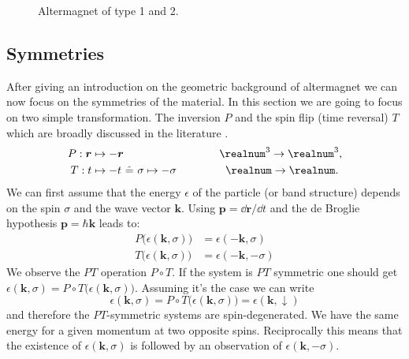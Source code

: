 \documentclass[../main.tex]{main.tex}
\begin{document}
\begin{figure}[H]

    \caption{Altermagnet of type 1 and 2.}
    \label{fig:altermagnet_lattice}
\end{figure}    

\subsection{Symmetries}
After giving an introduction on the geometric background of altermagnet we can now focus on the symmetries of the material. In this section
we are going to focus on two simple transformation. The inversion $P$ and the spin flip (time reversal) $T$ which are broadly discussed in the literature \cite{Smejkal2022}\cite{Smejkal2022_2}.
\begin{alignat*}{2}
    P : \bm{r} &\mapsto -\bm{r} ~~~~~~~~~~~~~~~~~~~~ &~~~\realnum^3 \rightarrow \realnum^3, \\
    T : t &\mapsto -t  ~\hat{=} ~\sigma \mapsto -\sigma &\realnum \rightarrow \realnum.~
\end{alignat*}
We can first assume that the energy $\epsilon$ of the particle (or band structure) depends on the spin $\sigma$ and the wave vector $\bm{k}$. Using $\bm{p} = \dd \bm{r}/\dd t$ and the de Broglie hypothesis 
$\bm{p} = \hbar\bm{k}$ \cite{Broglie1924} leads to: 
\begin{align*}
    P \bigl(\epsilon(\bm{k}, \sigma)\bigr) &= \epsilon(-\bm{k}, \sigma)\\
    T \bigl(\epsilon(\bm{k}, \sigma)\bigr) &= \epsilon(-\bm{k}, -\sigma)
\end{align*}
We observe the $PT$ operation $P\circ T$. If the system is $PT$ symmetric one should get $\epsilon(\bm{k}, \sigma)= P\circ T\bigl(\epsilon(\bm{k}, \sigma)\bigr)$.
Assuming it's the case we can write
\[
    \epsilon(\bm{k}, \sigma)= P\circ T\bigl(\epsilon(\bm{k}, \sigma)\bigr) =  \epsilon(\bm{k}, \downarrow)
\] 
and therefore the $PT$-symmetric systems are spin-degenerated. We have the same energy for a given momentum at two opposite spins.
 Reciprocally this means that the existence 
of $ \epsilon(\bm{k}, \sigma)$ is followed by an observation of $ \epsilon(\bm{k}, -\sigma)$.\\
\end{document}
